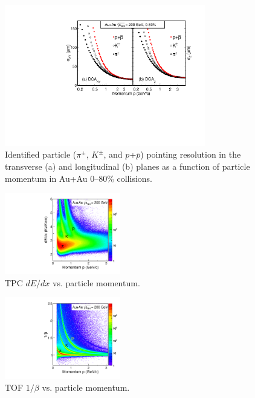 \documentclass[%
 reprint,	
showpacs,
 amsmath,amssymb,
 aps,
 prc,
]{revtex4-1}
\begin{document}
\begin{figure}
\centering
\includegraphics[width=0.78\textwidth]{fig/DCAXy_Z.pdf}
\caption{Identified particle ($\pi^{\pm}$, $K^{\pm}$, and $p$+$\bar{p}$) pointing resolution in the transverse (a) and longitudinal (b) planes as a function of particle momentum in Au+Au 0--80\% collisions.}
\label{fig:DCAXy_Z} 
\end{figure}

\begin{figure}[h]
\centering
\includegraphics[width=0.45\textwidth]{fig/PID_dEdx.pdf}
\caption{TPC $dE/dx$ vs. particle momentum.}
\label{fig:PID_dEdx} 
\end{figure}

\begin{figure}[h]
\centering
\includegraphics[width=0.45\textwidth]{fig/PID_beta.pdf}
\caption{TOF $1/\beta$ vs. particle momentum.}
\label{fig:PID_beta} 
\end{figure}
\end{document}
